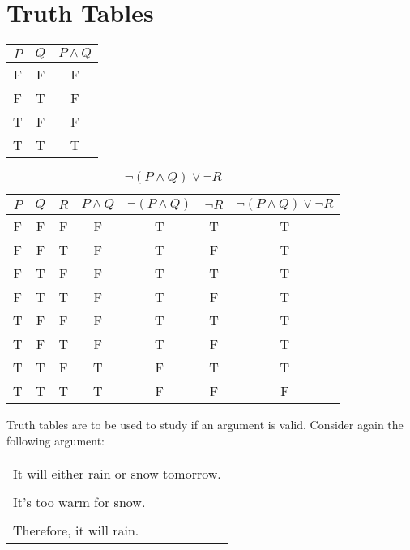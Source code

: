 \section{Truth Tables}

\begin{center}
 \begin{tabular}{|c|c|c|}
   \hline
   $P$ & $Q$ & $P \land Q$\\
   \hline
   F & F & F\\
   F & T & F\\
   T & F & F\\
   T & T & T\\
   \hline
 \end{tabular}
 \label{tab:P_and_Q}
\end{center}



\sol 
\begin{table}[h]
  \centering
  \label{tab:not_(P_and_Q)_or_not_R }
  \begin{tabular}{|c|c|c|c|c|c|c|}
    \hline
    $P$ & $Q$ & $R$ & $P \land Q$ & $\neg (P \land Q)$ & $\neg R$ & $\neg (P \land Q) \lor \neg R$\\
    \hline 
    F & F & F & F & T & T & T\\      
    F & F & T & F & T & F & T\\
    F & T & F & F & T & T & T\\
    F & T & T & F & T & F & T\\
    T & F & F & F & T & T & T\\
    T & F & T & F & T & F & T\\
    T & T & F & T & F & T & T\\ 
    T & T & T & T & F & F & F\\
    \hline
  \end{tabular}
  \caption{$\neg (P \land Q) \lor \neg R$}
\end{table}

Truth tables are to be used to study if an argument is valid.
Consider again the following argument:

\begin{tabular}{l}
\\
It will either rain or snow tomorrow.\\
\\
It's too warm for snow.\\
\\
Therefore, it will rain.\\
\end{tabular}


